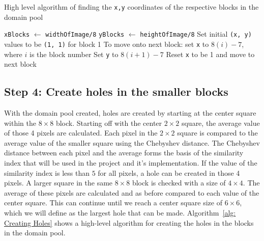 \documentclass[10pt,twocolumn, a4paper]{witseiepaper}
\def\code#1{\texttt{#1}}
\begin{document}
\begin{algorithm}[h!]
\caption{High level algorithm of finding the \code{x,y} coordinates of the respective blocks in the domain pool}
\label{alg: Block index}
\begin{algorithmic}
\State \code{xBlocks} $\leftarrow$ \code{widthOfImage/8}
\State \code{yBlocks} $\leftarrow$ \code{heightOfImage/8}
\State Set initial \code{(x, y)} values to be \code{(1, 1)} for block 1
\State To move onto next block:
\State \quad set \code{x} to $8(i)-7$, where $i$ is the block number
\If{\code{BlockNumber > xBlocks}}
	\State Set \code{y} to $8(i+1)-7$
	\State Reset \code{x} to be 1 and move to next block
\EndIf
\end{algorithmic}
\end{algorithm}

\subsection{Step 4: Create holes in the smaller blocks}
\label{sec: Step 4}
With the domain pool created, holes are created by starting at the center square within the $8\times 8$ block. Starting off with the center $2\times 2$ square, the average value of those 4 pixels are calculated. Each pixel in the $2\times 2$ square is compared to the average value of the smaller square using the Chebyshev distance. The Chebyshev distance between each pixel and the average forms the basis of the similarity index that will be used in the project and it's implementation. If the value of the similarity index is less than $5$ for all pixels, a hole can be created in those 4 pixels. A larger square in the same $8\times 8$ block is checked with a size of $4\times 4$. The average of these pixels are calculated and as before compared to each value of the center square. This can continue until we reach a center square size of $6\times 6$, which we will define as the largest hole that can be made. Algorithm~\ref{alg: Creating Holes} shows a high-level algorithm for creating the holes in the blocks in the domain pool.
\end{document}
